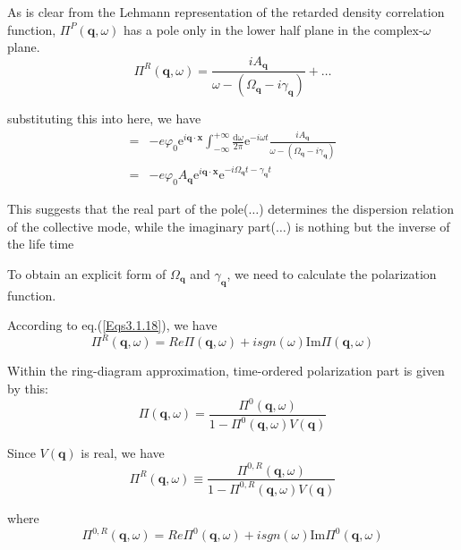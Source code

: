 As is clear from the Lehmann representation of the retarded density correlation function, $\Pi^P(\mathbf{q},\omega)$ has a pole only in the lower half plane in the complex-$\omega$ plane.
\begin{equation} \label{Eqs3.2.5}
\Pi^R(\mathbf{q},\omega) = \frac{i A_{\mathbf{q}}}{\omega - (\Omega_{\mathbf{q}}-i \gamma_{\mathbf{q}})} + \ldots
\end{equation}

substituting this into here, we have
\begin{equation} \label{Eqs3.2.6} \begin{split}
=& - e \varphi_0 \mathrm{e}^{i \mathbf{q} \cdot \mathbf{x}} \int_{-\infty}^{+\infty} \frac{\mathrm{d}\omega}{2\pi}\mathrm{e}^{-i \omega t} \frac{i A_{\mathbf{q}}}{\omega - (\Omega_{\mathbf{q}}-i \gamma_{\mathbf{q}})}\\
=& - e \varphi_0 A_{\mathbf{q}} \mathrm{e}^{i \mathbf{q} \cdot \mathbf{x}} \mathrm{e}^{-i \Omega_{\mathbf{q}} t - \gamma_{\mathbf{q}} t}
\end{split}\end{equation}

This suggests that the real part of the pole($\ldots$) determines the dispersion relation of the collective mode, while the imaginary part($\ldots$) is nothing but the inverse of the life time

To obtain an explicit form of $\Omega_{\mathbf{q}}$ and $\gamma_{\mathbf{q}}$, we need to calculate the polarization function.

According to eq.(\ref{Eqs3.1.18}), we have
\[\Pi^R(\mathbf{q},\omega) = Re\Pi(\mathbf{q},\omega) + i sgn(\omega) \text{Im} \Pi(\mathbf{q},\omega)\]

Within the ring-diagram approximation, time-ordered polarization part is given by this:
\begin{equation*} \label{Eqs2.8.5''} \tag{2.8.5''} \Pi(\mathbf{q},\omega) = \frac{\Pi^{0}(\mathbf{q},\omega)}{1-\Pi^{0}(\mathbf{q},\omega) V(\mathbf{q})} \end{equation*}

Since $V(\mathbf{q})$ is real, we have
\begin{equation} \label{Eqs3.2.7}
\Pi^R(\mathbf{q},\omega) \equiv \frac{\Pi^{0,R}(\mathbf{q},\omega)}{1-\Pi^{0,R}(\mathbf{q},\omega)V(\mathbf{q})}
\end{equation}

where
\[\Pi^{0,R}(\mathbf{q},\omega) = Re\Pi^0(\mathbf{q},\omega) + i sgn(\omega) \text{Im} \Pi^0(\mathbf{q},\omega)\]

